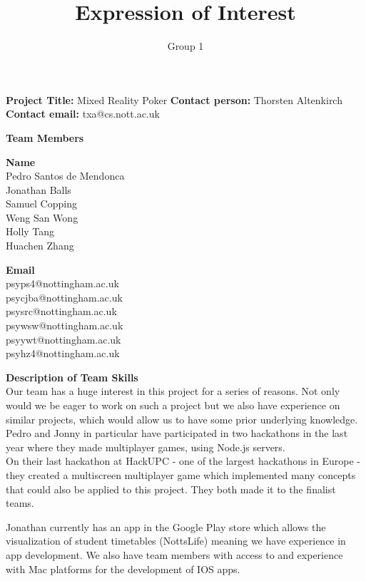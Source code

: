 \documentclass[11pt, oneside]{article}
\title{Expression of Interest}
\author{Group 1}
\begin{document}
\maketitle
\textbf{Project Title: }Mixed Reality Poker\newline
\textbf{Contact person: }Thorsten Altenkirch\newline
\textbf{Contact email: }txa@cs.nott.ac.uk\newline
    
\vspace{0.3cm}
\textbf{Team Members}\newline
\begin{minipage}[t]{0.5\textwidth}
    \textbf{Name}\\
    Pedro Santos de Mendonca\\
    Jonathan Balls\\
    Samuel Copping\\
    Weng San Wong\\
    Holly Tang\\
    Huachen Zhang\\
\end{minipage}
\begin{minipage}[t]{0.5\textwidth}
    \textbf{Email}\\
    psyps4@nottingham.ac.uk \\
    psycjba@nottingham.ac.uk \\
    psysrc@nottingham.ac.uk \\
    psywsw@nottingham.ac.uk \\
    psyywt@nottingham.ac.uk \\
    psyhz4@nottingham.ac.uk \\
\end{minipage}
\textbf{Description of Team Skills}\\
Our team has a huge interest in this project for a series of reasons. Not only would we be eager to work on such a project but we also have experience on similar projects, which would allow us to have some prior underlying knowledge. Pedro and Jonny in particular have participated in two hackathons in the last year where they made multiplayer games, using Node.js servers.\\
On their last hackathon at HackUPC - one of the largest hackathons in Europe - they created a multiscreen multiplayer game which implemented many concepts that could also be applied to this project. They both made it to the finalist teams. 

Jonathan currently has an app in the Google Play store which allows the visualization of student timetables (NottsLife) meaning we have experience in app development. We also have team members with access to and experience with Mac platforms for the development of IOS apps.
\end{document}
